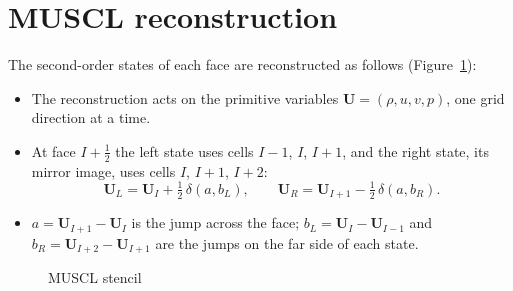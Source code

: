 \documentclass[12pt,a4paper]{article}
\begin{document}
\clearpage
\section{MUSCL reconstruction}\label{app:muscl}

The second-order states of each face are reconstructed as follows (Figure~\ref{fig:muscl}):
\begin{itemize}
  \item The reconstruction acts on the primitive variables $\mathbf{U}=(\rho,u,v,p)$, one grid
  direction at a time.
  \item At face $I+\tfrac12$ the left state uses cells $I-1$, $I$, $I+1$, and the right state,
  its mirror image, uses cells $I$, $I+1$, $I+2$:
  \begin{equation}
    \mathbf{U}_L=\mathbf{U}_I+\tfrac12\,\delta(a,b_L),
    \qquad
    \mathbf{U}_R=\mathbf{U}_{I+1}-\tfrac12\,\delta(a,b_R).
    \label{eq:muscl}
  \end{equation}
  \item $a=\mathbf{U}_{I+1}-\mathbf{U}_I$ is the jump across the face;
  $b_L=\mathbf{U}_I-\mathbf{U}_{I-1}$ and $b_R=\mathbf{U}_{I+2}-\mathbf{U}_{I+1}$ are the jumps on
  the far side of each state.
\end{itemize}

\begin{figure}[H]
  \centering
  \caption{MUSCL stencil}
  \label{fig:muscl}
\end{figure}
\end{document}

